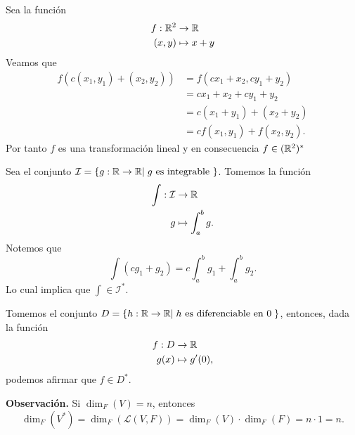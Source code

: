 \documentclass[12pt,a4paper]{book}
\newcommand{\llaves}[1]{\{#1\}}
\begin{document}
    \begin{ejemplo}
    \label{ej:36}
        Sea la función
        \begin{align*}
            f: \mathbb{R}^{2} & \to \mathbb{R}\\
            (x, y) & \mapsto x + y
        \end{align*}
        Veamos que
        \begin{align*}
            f(c(x_{1}, y_{1}) + (x_{2}, y_{2})) & = f(cx_{1} + x_{2}, cy_{1} + y_{2})\\
            & = cx_{1} + x_{2} + cy_{1} + y_{2}\\
            & = c(x_{1} + y_{1}) + (x_{2} + y_{2})\\
            & = cf(x_{1}, y_{1}) + f(x_{2}, y_{2}).
        \end{align*}
        Por tanto $f$ es una transformación lineal y en consecuencia $f \in (\mathbb{R}^{2})^{*}$
    \end{ejemplo}

    \begin{ejemplo}
    \label{ej:37}
        Sea el conjunto $\mathcal{I}= \llaves{g:\R \to \R |\; g \text{ es integrable }}$. Tomemos la función
        \begin{align*}
            \int: \mathcal{I} & \to \mathbb{R} \\
            g & \mapsto \int_{a}^{b}g.
        \end{align*}
        Notemos que 
        \begin{equation*}
            \int(cg_{1} + g_{2}) = c \int_{a}^{b}g_{1} + \int_{a}^{b}g_{2}.
        \end{equation*}
        Lo cual implica que $\int \in \mathcal{I}^{*}$.
    \end{ejemplo}

    \vspace{1.6cm}

    \begin{ejemplo}
    \label{ej:38}
        Tomemos el conjunto $D = \llaves{h: \R \to \R | \; h \text{ es diferenciable en }0 \;}$, entonces, dada la función
        \begin{align*}
            f: D & \to \mathbb{R}\\
            g(x) & \mapsto g'(0),
        \end{align*}
        podemos afirmar que $f \in D^{*}$.
    \end{ejemplo}


    \textbf{Observación.} Si $\dim_{F}(V) = n$, entonces
    \begin{equation*}
        \dim_{F}(V^{*}) = \dim_{F}(\mathcal{L}(V, F)) = \dim_{F}(V) \cdot \dim_{F}(F) = n \cdot 1 = n.
    \end{equation*}
\end{document}
